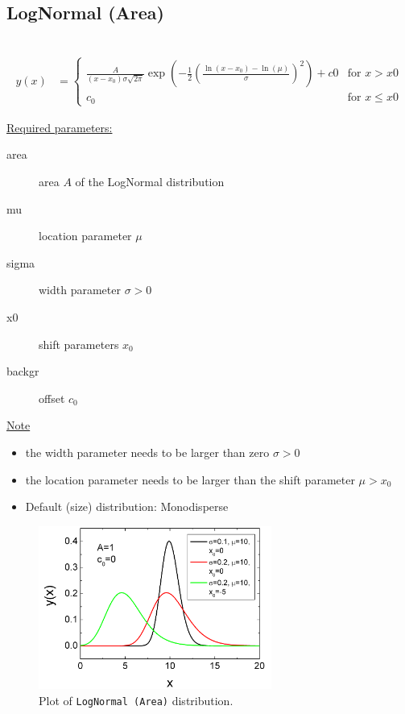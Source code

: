 \clearpage
\subsection{LogNormal (Area)} ~\\
\label{sec:LogNormalArea}
\begin{align}
y(x) &=
\begin{cases}
        \frac{A}{(x-x_0)\sigma \sqrt{2 \pi}}
        \exp\left(-\frac{1}{2}\left(\frac{\ln (x-x_0) -
        \ln(\mu)}{\sigma}\right)^2\right) + c0 & \mbox{for } x>x0 \\
        c_0 & \mbox{for } x \leq x0
\end{cases}
\end{align}

\underline{Required parameters:}
\begin{description}
    \item[area] area $A$ of the LogNormal distribution
    \item[mu] location parameter $\mu$
    \item[sigma] width parameter $\sigma > 0$
    \item[x0] shift parameters $x_0$
    \item[backgr] offset $c_0$
\end{description}

\underline{Note}
\begin{itemize}
  \item the width parameter needs to be larger than zero $\sigma > 0$
  \item the location parameter needs to be larger than the shift parameter $\mu > x_0$
  \item Default (size) distribution: Monodisperse
\end{itemize}

\begin{figure}[htb]
\begin{center}
\includegraphics[width=0.6824\textwidth]{LogNormalArea.png}
\end{center}
\caption{Plot of \texttt{LogNormal (Area)} distribution.}
\label{fig:LogNormalArea}
\end{figure}


